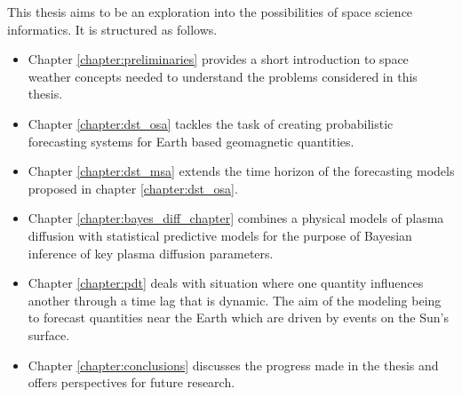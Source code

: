 This thesis aims to be an exploration into the possibilities of space science informatics. It is structured as follows.

\begin{itemize}
    \item Chapter \ref{chapter:preliminaries} provides a short introduction to space weather concepts needed to 
    understand the problems considered in this thesis.
    \item Chapter \ref{chapter:dst_osa} tackles the task of creating probabilistic forecasting systems for Earth 
    based geomagnetic quantities.
    \item Chapter \ref{chapter:dst_msa} extends the time horizon of the forecasting models proposed in chapter 
    \ref{chapter:dst_osa}.
    \item Chapter \ref{chapter:bayes_diff_chapter} combines a physical models of plasma diffusion with 
    statistical predictive models for the purpose of Bayesian inference of key plasma diffusion parameters.
    \item Chapter \ref{chapter:pdt} deals with situation where one quantity influences another through a 
    time lag that is dynamic. The aim of the modeling being to forecast quantities near the Earth which 
    are driven by events on the Sun's surface. 
    \item Chapter \ref{chapter:conclusions} discusses the progress made in the thesis and offers perspectives 
    for future research.
\end{itemize}

\clearpage
%
%
